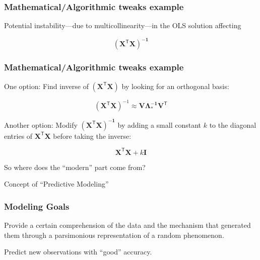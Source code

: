 \documentclass[12pt]{beamer}\usepackage[]{graphicx}\usepackage[]{color}
\begin{document}
\begin{frame}
\frametitle{Mathematical/Algorithmic tweaks example}

Potential instability---due to multicollinearity---in the OLS solution affecting

{\Large
$$
\mathbf{(X^{\mathsf{T}} X)^{-1}}
$$
}

\end{frame}


\begin{frame}
\frametitle{Mathematical/Algorithmic tweaks example}

{\mdlit One option}: Find inverse of $\mathbf{(X^{\mathsf{T}} X)}$ by
looking for an orthogonal basis:

{\Large
$$
(\mathbf{X^{\mathsf{T}} X})^{-1} \approx \mathbf{V \Lambda_{*}^{-1} V^\mathsf{T}}
$$
}

\pause
\bigskip
{\lit Another option}: Modify $\mathbf{(X^{\mathsf{T}} X)^{-1}}$ by
adding a small constant $k$ to the diagonal entries of $\mathbf{X^{\mathsf{T}} X}$
before taking the inverse:

{\Large
$$
\mathbf{X^{\mathsf{T}} X} + k \mathbf{I}
$$
}

\end{frame}


\begin{frame}
\begin{center}
{\lolit So where does the ``modern'' part come from?}

\Large{\mdlit Concept of ``Predictive Modeling''}
\end{center}
\end{frame}


\begin{frame}
\frametitle{Modeling Goals}

Provide a certain comprehension of the data and the mechanism
that generated them through a parsimonious representation of 
a random phenomenon.
\eb

Predict new observations with ``good'' accuracy.
\eb

\end{frame}

\end{document}
